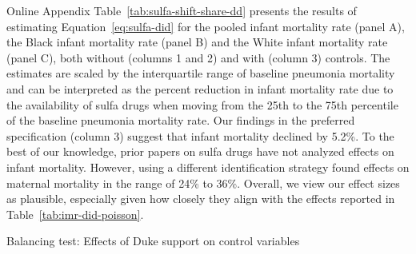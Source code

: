 \documentclass[12pt]{article}
\begin{document}
Online Appendix Table~\ref{tab:sulfa-shift-share-dd} presents the results of estimating Equation~\ref{eq:sulfa-did} for the pooled infant mortality rate (panel A), the Black infant mortality rate (panel B) and the White infant mortality rate (panel C), both without (columns 1 and 2) and with (column 3) controls.
The estimates are scaled by the interquartile range of baseline pneumonia mortality and can be interpreted as the percent reduction in infant mortality rate due to the availability of sulfa drugs when moving from the 25th to the 75th percentile of the baseline pneumonia mortality rate.
Our findings in the preferred specification (column 3) suggest that infant mortality declined by 5.2\%. 
To the best of our knowledge, prior papers on sulfa drugs have not analyzed effects on infant mortality. However,  using a different identification strategy found effects on maternal mortality in the range of 24\% to 36\%.
Overall, we view our effect sizes as plausible, especially given how closely they align with the effects reported in Table~\ref{tab:imr-did-poisson}.

\begin{table}[!ht]\centering
  \begin{adjustbox}{width=.7\textwidth}
  \centering
    \begin{threeparttable}
      \caption{Balancing test: Effects of Duke support on control variables}
      \label{tab:balance-table}
    \end{threeparttable}
  \end{adjustbox}
\end{table}
\end{document}
